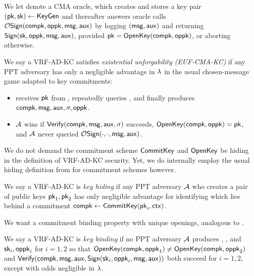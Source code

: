 \begin{definition}\label{def:vrf_sign_oracle}
We let  denote a CMA oracle, which creates and stores
a key pair $(\mathsf{pk},\mathsf{sk}) \leftarrow {\ensuremath{\mathsf{KeyGen}}}$ and thereafter
answers oracle calls $\mathcal{O}\mathsf{Sign}(\mathsf{compk},\mathsf{oppk},\mathsf{msg},\mathsf{aux})$ by 
logging $(\mathsf{msg},\mathsf{aux})$ and returning ${\mathsf{Sign}}(\mathsf{sk},\mathsf{oppk},\mathsf{msg},\mathsf{aux})$,
provided $\mathsf{pk} = {\mathsf{OpenKey}}(\mathsf{compk},\mathsf{oppk})$, or aborting otherwise.
\end{definition}

\begin{definition}
We say a VRF-AD-KC satisfies {\em existential unforgability (EUF-CMA-KC)} if
any PPT adversary \adv has only a negligible advantage in $\lambda$
in the usual chosen-message game adapted to key commitments:
\begin{itemize}
 \item \adv receives $\mathsf{pk}$ from , %
 repeatedly queries ,
  and finally produces $\mathsf{compk},\mathsf{msg},\mathsf{aux},\sigma,\mathsf{oppk}$.
 \item $\mathcal{A}$ wins if ${\mathsf{Verify}}(\mathsf{compk},\mathsf{msg},\mathsf{aux},\sigma)$ succeeds,
  ${\mathsf{OpenKey}}(\mathsf{compk},\mathsf{oppk}) = \mathsf{pk}$, and
   $\mathcal{A}$ never queried $\mathcal{O}\mathsf{Sign}(\cdot,\cdot,\mathsf{msg},\mathsf{aux})$.
\end{itemize}
\end{definition}

We do not demand the commitment scheme ${\mathsf{CommitKey}}$ and ${\mathsf{OpenKey}}$
be hiding in the definition of VRF-AD-KC security.
Yet, we do internally employ the usual hiding definition from
\cite[pp.8]{cryptoeprint:2019:1185} for commitment schemes however.

\begin{definition}
We say a VRF-AD-KC is {\em key hiding} if any PPT adversary $\mathcal{A}$
who creates a pair of public keys $\mathsf{pk}_1,\mathsf{pk}_2$
has only negligible advantage for identifying which lies behind a commitment
 $\mathsf{compk} \leftarrow {\ensuremath{\mathsf{CommitKey}}}(\mathsf{pk}_i,\mathsf{ctx})$.
\end{definition}

We want a commitment binding property with unique openings,
analogous to \cite[pp.9]{cryptoeprint:2019:1185}.

\begin{definition}\label{def:vrf_key_binding}
We say a VRF-AD-KC is {\em key binding} if no PPT adversary $\mathcal{A}$
produces \compk, \msg, \aux and $\mathsf{sk}_i,\mathsf{oppk}_i$ for $i=1,2$
so that
 ${\mathsf{OpenKey}}(\mathsf{compk},\mathsf{oppk}_1) \ne {\ensuremath{\mathsf{OpenKey}}}(\mathsf{compk},\mathsf{oppk}_2)$ and
 ${\mathsf{Verify}}(\mathsf{compk},\mathsf{msg},\mathsf{aux},{\mathsf{Sign}}(\mathsf{sk}_i,\mathsf{oppk}_i,\mathsf{msg},\mathsf{aux}))$
both succeed for $i=1,2$, except with odds negligible in $\lambda$.
\end{definition}


